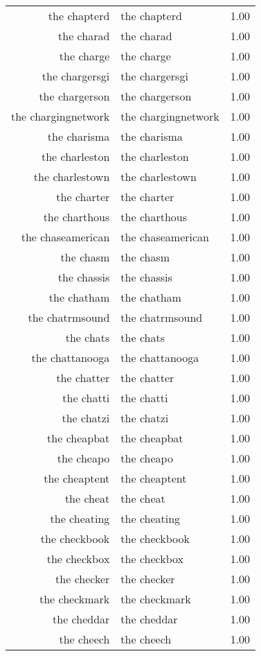 \begin{table}[ht]
\begin{tabular}{rlr}
  the chapterd & the chapterd & 1.00 \\ 
  the charad & the charad & 1.00 \\ 
  the charge & the charge & 1.00 \\ 
  the chargersgi & the chargersgi & 1.00 \\ 
  the chargerson & the chargerson & 1.00 \\ 
  the chargingnetwork & the chargingnetwork & 1.00 \\ 
  the charisma & the charisma & 1.00 \\ 
  the charleston & the charleston & 1.00 \\ 
  the charlestown & the charlestown & 1.00 \\ 
  the charter & the charter & 1.00 \\ 
  the charthous & the charthous & 1.00 \\ 
  the chaseamerican & the chaseamerican & 1.00 \\ 
  the chasm & the chasm & 1.00 \\ 
  the chassis & the chassis & 1.00 \\ 
  the chatham & the chatham & 1.00 \\ 
  the chatrmsound & the chatrmsound & 1.00 \\ 
  the chats & the chats & 1.00 \\ 
  the chattanooga & the chattanooga & 1.00 \\ 
  the chatter & the chatter & 1.00 \\ 
  the chatti & the chatti & 1.00 \\ 
  the chatzi & the chatzi & 1.00 \\ 
  the cheapbat & the cheapbat & 1.00 \\ 
  the cheapo & the cheapo & 1.00 \\ 
  the cheaptent & the cheaptent & 1.00 \\ 
  the cheat & the cheat & 1.00 \\ 
  the cheating & the cheating & 1.00 \\ 
  the checkbook & the checkbook & 1.00 \\ 
  the checkbox & the checkbox & 1.00 \\ 
  the checker & the checker & 1.00 \\ 
  the checkmark & the checkmark & 1.00 \\ 
  the cheddar & the cheddar & 1.00 \\ 
  the cheech & the cheech & 1.00 \\ 

\end{tabular}
\end{table}
